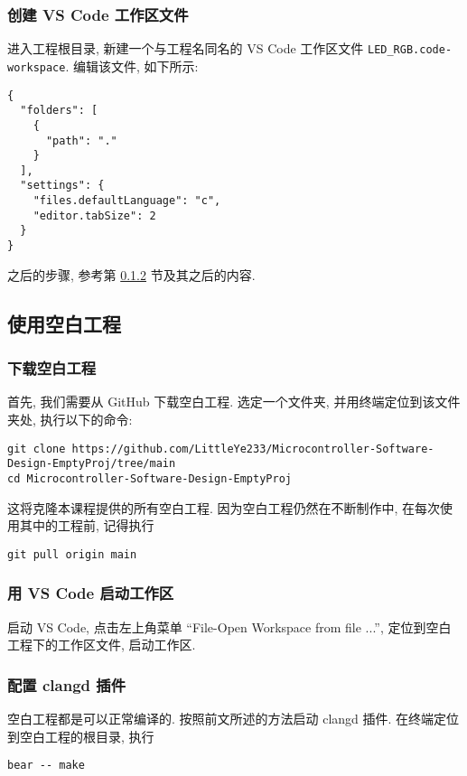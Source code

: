 \subsubsection{创建 VS Code 工作区文件}
进入工程根目录, 新建一个与工程名同名的 VS Code 工作区文件 \texttt{LED\_RGB.code-workspace}. 编辑该文件, 如下所示:

\begin{verbatim}
{
  "folders": [
    {
      "path": "."
    }
  ],
  "settings": {
    "files.defaultLanguage": "c",
    "editor.tabSize": 2
  }
}
\end{verbatim}

之后的步骤, 参考第 \ref{2-led-rgb workspace} 节及其之后的内容.

\subsection{使用空白工程}
\subsubsection{下载空白工程}
首先, 我们需要从 GitHub 下载空白工程. 选定一个文件夹, 并用终端定位到该文件夹处, 执行以下的命令:
\begin{verbatim}
git clone https://github.com/LittleYe233/Microcontroller-Software-Design-EmptyProj/tree/main
cd Microcontroller-Software-Design-EmptyProj
\end{verbatim}

这将克隆本课程提供的所有空白工程. 因为空白工程仍然在不断制作中, 在每次使用其中的工程前, 记得执行

\begin{verbatim}
git pull origin main
\end{verbatim}

\subsubsection{用 VS Code 启动工作区} \label{2-led-rgb workspace}
启动 VS Code, 点击左上角菜单 ``File-Open Workspace from file ...'', 定位到空白工程下的工作区文件, 启动工作区.

\subsubsection{配置 clangd 插件}
空白工程都是可以正常编译的. 按照前文所述的方法启动 clangd 插件. 在终端定位到空白工程的根目录, 执行

\begin{verbatim}
bear -- make
\end{verbatim}

